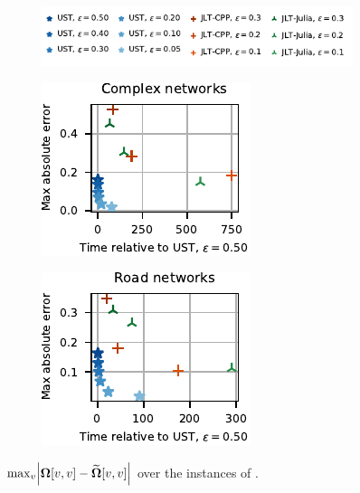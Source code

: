 \begin{figure}[tb]
\centering
\begin{subfigure}[t]{\textwidth}
\centering
\includegraphics{sources/plots/el-clos/forest-quality-legend.pdf}
\end{subfigure}\smallskip

\begin{subfigure}[t]{.45\textwidth}
\centering
\includegraphics[width=.7\textwidth]{sources/plots/el-clos/forest-max-abs-err-cplx.pdf}
\end{subfigure}\hfill
\begin{subfigure}[t]{.45\textwidth}
\centering
\includegraphics[width=.7\textwidth]{sources/plots/el-clos/forest-max-abs-err-road.pdf}
\end{subfigure}
\caption{$\max_v\left|\Fmat[v, v] - \Fmatapx[v, v]\right|$ over the instances
of .}
\label{fig:el-clos:forest-quality}
\end{figure}

